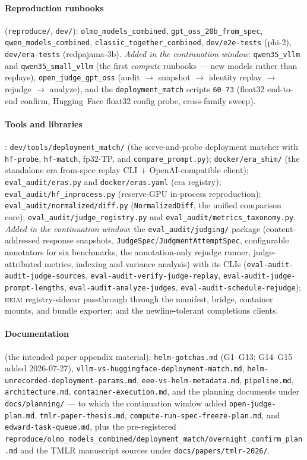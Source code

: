 \documentclass[11pt]{report}
\newcommand{\code}[1]{\texttt{#1}}
\newcommand{\file}[1]{\texttt{#1}}
\begin{document}
\paragraph{Reproduction runbooks} (\file{reproduce/}, \file{dev/}):
\code{olmo\_models\_combined}, \code{gpt\_oss\_20b\_from\_spec},
\code{qwen\_models\_combined}, \code{classic\_together\_combined},
\code{dev/e2e-tests} (phi-2), \code{dev/era-tests} (redpajama-3b). \emph{Added in
the continuation window}: \code{qwen35\_vllm} and \code{qwen35\_small\_vllm} (the
first \emph{compute} runbooks --- new models rather than replays),
\code{open\_judge\_gpt\_oss} (audit $\rightarrow$ snapshot $\rightarrow$ identity
replay $\rightarrow$ rejudge $\rightarrow$ analyze), and the
\code{deployment\_match} scripts \code{60}--\code{73} (float32 end-to-end confirm,
Hugging~Face float32 config probe, cross-family sweep).

\paragraph{Tools and libraries}: \code{dev/tools/deployment\_match/} (the
serve-and-probe deployment matcher with \code{hf-probe}, \code{hf-match},
fp32-TP, and \code{compare\_prompt.py}); \code{docker/era\_shim/} (the standalone
era from-spec replay CLI + OpenAI-compatible client); \code{eval\_audit/eras.py}
and \code{docker/eras.yaml} (era registry); \code{eval\_audit/hf\_inprocess.py}
(reserve-GPU in-process reproduction); \code{eval\_audit/normalized/diff.py}
(\code{NormalizedDiff}, the unified comparison core);
\code{eval\_audit/judge\_registry.py} and \code{eval\_audit/metrics\_taxonomy.py}.
\emph{Added in the continuation window}: the \code{eval\_audit/judging/} package
(content-addressed response snapshots, \code{JudgeSpec}/\code{JudgmentAttemptSpec},
configurable annotators for six benchmarks, the annotation-only rejudge runner,
judge-attributed metrics, indexing and variance analysis) with its CLIs
(\code{eval-audit-audit-judge-sources}, \code{eval-audit-verify-judge-replay},
\code{eval-audit-judge-prompt-lengths}, \code{eval-audit-analyze-judges},
\code{eval-audit-schedule-rejudge}); \textsc{helm} registry-sidecar passthrough
through the manifest, bridge, container mounts, and bundle exporter; and the
newline-tolerant completions clients.

\paragraph{Documentation} (the intended paper appendix material):
\file{helm-gotchas.md} (G1--G13; G14--G15 added 2026-07-27), \file{vllm-vs-huggingface-deployment-match.md},
\file{helm-unrecorded-deployment-params.md}, \file{eee-vs-helm-metadata.md},
\file{pipeline.md}, \file{architecture.md}, \file{container-execution.md}, and the
planning documents under \file{docs/planning/} --- to which the continuation window
added \file{open-judge-plan.md}, \file{tmlr-paper-thesis.md},
\file{compute-run-spec-freeze-plan.md}, and \file{edward-task-queue.md}, plus the
pre-registered
\file{reproduce/olmo\_models\_combined/deployment\_match/overnight\_confirm\_plan.md}
and the TMLR manuscript sources under \file{docs/papers/tmlr-2026/}.
\end{document}
